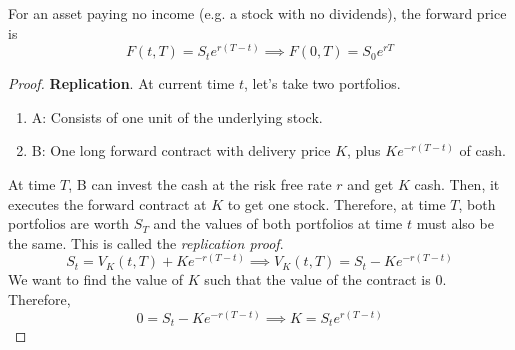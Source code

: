 \documentclass{article}
\begin{document}
    \begin{theorem}
      For an asset paying no income (e.g. a stock with no dividends), the forward price is 
      \begin{equation}
        F(t, T) = S_t e^{r (T - t)} \implies F(0, T) = S_0 e^{r T}
      \end{equation} 
    \end{theorem}
    \begin{proof}
      \textbf{Replication}. At current time $t$, let's take two portfolios. 
      \begin{enumerate}
        \item A: Consists of one unit of the underlying stock. 
        \item B: One long forward contract with delivery price $K$, plus $K e^{-r(T - t)}$ of cash. 
      \end{enumerate}
      At time $T$, B can invest the cash at the risk free rate $r$ and get $K$ cash. Then, it executes the forward contract at $K$ to get one stock. Therefore, at time $T$, both portfolios are worth $S_T$ and the values of both portfolios at time $t$ must also be the same. This is called the \textit{replication proof}. 
      \begin{equation}
        S_t = V_K (t, T) + K e^{-r (T - t)} \implies V_K (t, T)= S_t - K e^{-r (T - t)}
      \end{equation}
      We want to find the value of $K$ such that the value of the contract is $0$. Therefore, 
      \begin{equation}
        0 = S_t - K e^{-r (T - t)} \implies K = S_t e^{r (T - t)}
      \end{equation}
    \end{proof}
\end{document}

